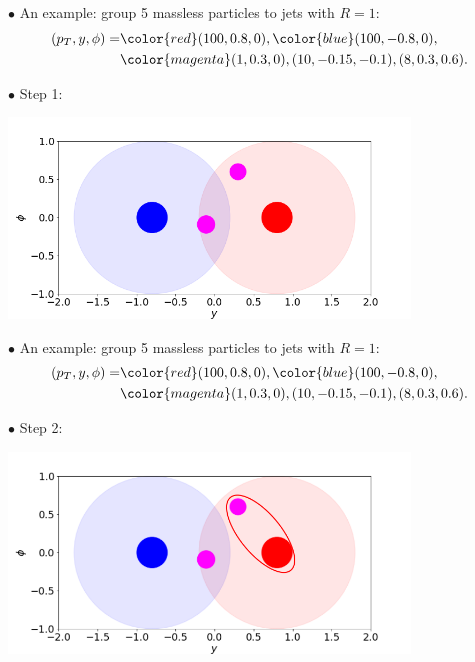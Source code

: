 \documentclass[9pt,a4paper,unknownkeysallowed,xcolor=dvipsnames,aspectratio=43]{beamer}
\begin{document}
%
%
\begin{frame}\vspace{2mm}

{\color{darkred}\Large$\bullet$} An example: group 5 massless particles to jets with $R=1$:
\begin{align}
(p_T, y, \phi) = &{\color{red}(100, 0.8, 0)}, {\color{blue}(100, -0.8, 0)},\notag\\
&{\color{magenta}(1, 0.3, 0), (10, -0.15, -0.1), (8, 0.3, 0.6)}.\notag
\end{align}

{\color{darkred}\Large$\bullet$} Step 1:
\vspace{2mm}
\begin{center}
\includegraphics[width=0.8\textwidth]{kt1.png}
\end{center}
\end{frame}
%
%
\begin{frame}\vspace{2mm}

{\color{darkred}\Large$\bullet$} An example: group 5 massless particles to jets with $R=1$:
\begin{align}
(p_T, y, \phi) = &{\color{red}(100, 0.8, 0)}, {\color{blue}(100, -0.8, 0)},\notag\\
&{\color{magenta}(1, 0.3, 0), (10, -0.15, -0.1), (8, 0.3, 0.6)}.\notag
\end{align}

{\color{darkred}\Large$\bullet$} Step 2:
\vspace{2mm}
\begin{center}
\includegraphics[width=0.8\textwidth]{kt12.png}
\end{center}
\end{frame}
\end{document}
